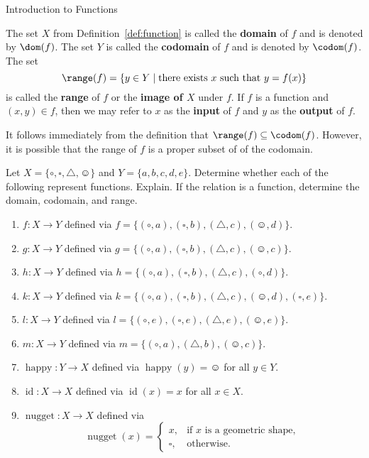 \begin{section}{Introduction to Functions}
\begin{definition}
The set $X$ from Definition~\ref{def:function} is called the \textbf{domain} of $f$ and is denoted by $\dom(f)$.  The set $Y$ is called the \textbf{codomain} of $f$ and is denoted by $\codom(f)$.  The set
\[
\range(f)=\{y\in Y\mid \mbox{there exists }x\mbox{ such that } y=f(x)\}
\]
is called the \textbf{range} of $f$ or the \textbf{image of $X$} under $f$. If $f$ is a function and $(x,y)\in f$, then we may refer to $x$ as the \textbf{input} of $f$ and $y$ as the \textbf{output} of $f$.
\end{definition}

It follows immediately from the definition that $\range(f)\subseteq \codom(f)$.  However, it is possible that the range of $f$ is a proper subset of of the codomain.

\begin{exercise}\label{exer:lots}
Let $X=\{\circ, \square,\triangle,\smiley\}$ and $Y=\{a,b,c,d,e\}$.  Determine whether each of the following represent functions.  Explain.  If the relation is a function, determine the domain, codomain, and range.

\begin{enumerate}[label=\textrm{(\alph*)}]
\item $f:X\to Y$ defined via $f=\{(\circ, a),(\square,b),(\triangle,c),(\smiley,d)\}$.
\item $g:X\to Y$ defined via $g=\{(\circ, a),(\square,b),(\triangle,c),(\smiley,c)\}$.
\item $h:X\to Y$ defined via $h=\{(\circ, a),(\square,b),(\triangle,c),(\circ,d)\}$.
\item $k:X\to Y$ defined via $k=\{(\circ, a),(\square,b),(\triangle,c),(\smiley,d),(\square,e)\}$.
\item $l:X\to Y$ defined via $l=\{(\circ, e),(\square,e),(\triangle,e),(\smiley,e)\}$.
\item $m:X\to Y$ defined via $m=\{(\circ, a),(\triangle,b),(\smiley,c)\}$.
\item $\operatorname{happy}:Y\to X$ defined via $\operatorname{happy}(y)=\smiley$ for all $y\in Y$.
\item $\operatorname{id}:X\to X$ defined via $\operatorname{id}(x)=x$ for all $x\in X$.
\item $\operatorname{nugget}:X\to X$ defined via 
\[
\operatorname{nugget}(x)=\begin{cases}
x, & \mbox{if } x\mbox{ is a geometric shape},\\
\square, & \mbox{otherwise}.
\end{cases}
\]
\end{enumerate}
\end{exercise}


\end{section}
